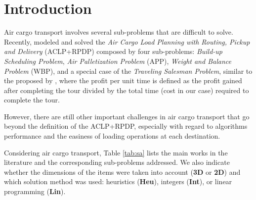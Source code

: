 \documentclass[preprint,authoryear]{elsarticle}
\begin{document}
\label{sec1}
\section{Introduction}


Air cargo transport involves several sub-problems that are difficult to solve. Recently, \cite{MesquitaSanches2023} modeled and solved the {\it Air Cargo Load Planning with Routing, Pickup and Delivery} (ACLP+RPDP) composed by four sub-problems: {\it Build-up Scheduling Problem}, {\it Air Palletization Problem} (APP), {\it Weight and Balance Problem} (WBP), and a special case of the {\it Traveling Salesman Problem}, similar to the proposed by \cite{kaspi2019}, where the profit per unit time is defined as the profit gained after completing the tour divided by the total time (cost in our case) required to complete the tour.

However, there are still other important challenges in air cargo transport that go beyond the definition of the ACLP+RPDP, especially with regard to algorithms performance and the easiness of loading operations at each destination.

Considering air cargo transport, Table \ref{tab:sa} lists the main works in the literature and the corresponding sub-problems addressed. We also indicate whether the dimensions of the items were taken into account ({\bf 3D} or {\bf 2D}) and which solution method was used: heuristics ({\bf Heu}), integers ({\bf Int}), or linear programming ({\bf Lin}).
\end{document}
